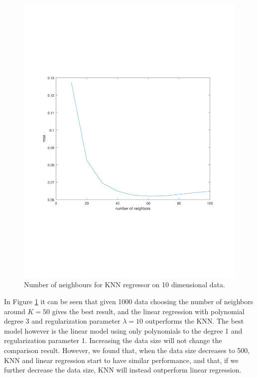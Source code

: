 \documentclass[]{article}
\begin{document}
 \begin{figure}[ht]
	\centering
	\includegraphics[trim= 10cm 5cm 10cm 5cm, scale=0.4]{proj1-4_2e-KNN}
	\caption{Number of neighbours for KNN regressor on 10 dimensional data.}
	\label{fig:proj1-4_2e-KNN}
\end{figure}

In Figure \ref{fig:proj1-4_2e-KNN} it can be seen that given 1000 data choosing the number of neighbors around $K=50$ gives the best result, and the linear regression with polynomial degree 3 and regularization parameter $\lambda=10$ outperforms the KNN. The best model however is the linear model using only polynomials to the degree 1 and regularization parameter 1. Increasing the data size will not change the comparison result. However, we found that, when the data size decreases to 500, KNN and linear regression start to have similar performance, and that, if we further decrease the data size, KNN will instead outperform linear regression.
\end{document}
